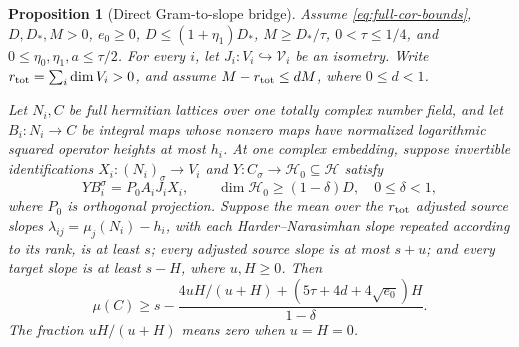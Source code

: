 \documentclass[11pt,a4paper]{article}
\numberwithin{equation}{section}
\newtheorem{proposition}[theorem]{Proposition}
\theoremstyle{remark}\newtheorem{remark}[theorem]{Remark}
\begin{document}
\begin{proposition}[Direct Gram-to-slope bridge]\label{prop:direct-gram-slope}
Assume \eqref{eq:full-cor-bounds}, $D,D_*,M>0$, $e_0\ge0$,
$D\le(1+\eta_1)D_*$, $M\ge D_*/\tau$,
$0<\tau\le1/4$, and $0\le\eta_0,\eta_1,a\le\tau/2$.
For every $i$, let $J_i:V_i\hookrightarrow\mathcal V_i$ be an isometry.
Write $r_{\rm tot}=\sum_i\dim V_i>0$, and assume $M-r_{\rm tot}\le dM$, where $0\le d<1$.

Let $N_i,C$ be full hermitian lattices over one totally complex number field,
and let $B_i:N_i\to C$ be integral maps whose nonzero maps have normalized
logarithmic squared operator heights at most $h_i$.
At one complex embedding, suppose invertible identifications
$X_i:(N_i)_\sigma\to V_i$ and $Y:C_\sigma\to\mathcal H_0\subseteq\mathcal H$
satisfy
\[
YB_i^\sigma=P_0A_iJ_iX_i,\qquad
\dim\mathcal H_0\ge(1-\delta)D,\quad 0\le\delta<1,
\]
where $P_0$ is orthogonal projection.  Suppose the mean over the $r_{\rm tot}$
adjusted source slopes $\lambda_{ij}=\mu_j(N_i)-h_i$, with each
Harder--Narasimhan slope repeated according to its rank, is at least $s$;
every adjusted source slope is at most $s+u$; and every target slope is
at least $s-H$, where $u,H\ge0$.  Then
\begin{equation}\label{eq:direct-gram-slope}
\mu(C)\ge s-
\frac{4uH/(u+H)+(5\tau+4d+4\sqrt{e_0})H}{1-\delta}.
\end{equation}
The fraction $uH/(u+H)$ means zero when $u=H=0$.
\end{proposition}
\end{document}
